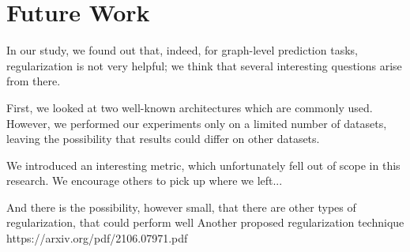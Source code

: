 \section{Future Work}
\label{sec:conclusion:future}

In our study, we found out that, indeed, for graph-level prediction tasks, regularization is not very helpful; we think that several interesting questions arise from there.

First, we looked at two well-known architectures which are commonly used.
However, we performed our experiments only on a limited number of datasets, leaving the possibility that results could differ on other datasets.

We introduced an interesting metric, which unfortunately fell out of scope in this research.
We encourage others to pick up where we left...



And there is the possibility, however small, that there are other types of regularization, that could perform well
Another proposed regularization technique
https://arxiv.org/pdf/2106.07971.pdf